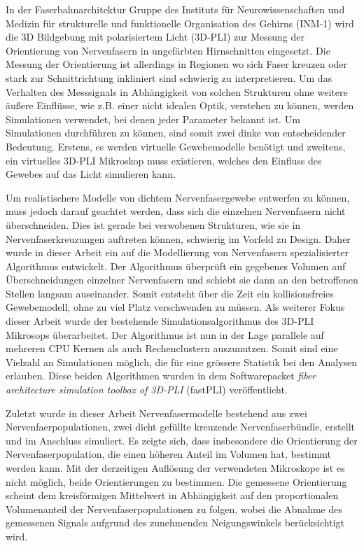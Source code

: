 % 
% 
% 
{
\let\cleardoublepage\clearpage
{}
}
% 
In der Faserbahnarchitektur Gruppe des Instituts für Neurowissenschaften und Medizin für strukturelle und funktionelle Organisation des Gehirns (INM-1) wird die 3D Bildgebung mit polarisiertem Licht (3D-PLI) zur Messung der Orientierung von Nervenfasern in ungefärbten Hirnschnitten eingesetzt.
Die Messung der Orientierung ist allerdings in Regionen wo sich Faser kreuzen oder stark zur Schnittrichtung inkliniert sind schwierig zu interpretieren.
Um das Verhalten des Messsignals in Abhängigkeit von solchen Strukturen ohne weitere äußere Einflüsse, wie z.B. einer nicht idealen Optik, verstehen zu können, werden Simulationen verwendet, bei denen jeder Parameter bekannt ist.
Um Simulationen durchführen zu können, sind somit zwei dinke von entscheidender Bedeutung.
Erstens, es werden virtuelle Gewebemodelle benötigt und zweitens, ein virtuelles 3D-PLI Mikroskop muss existieren, welches den Einfluss des Gewebes auf das Licht simulieren kann. 

Um realistischere Modelle von dichtem Nervenfasergewebe entwerfen zu können, muss jedoch darauf geachtet werden, dass sich die einzelnen Nervenfasern nicht überschneiden.
Dies ist gerade bei verwobenen Strukturen, wie sie in Nervenfaserkreuzungen auftreten können, schwierig im Vorfeld zu Design.
Daher wurde in dieser Arbeit ein auf die Modellierung von Nervenfasern spezialisierter Algorithmus entwickelt.
Der Algorithmus überprüft ein gegebenes Volumen auf Überschneidungen einzelner Nervenfasern und schiebt sie dann an den betroffenen Stellen langsam auseinander.
Somit entsteht über die Zeit ein kollisionsfreies Gewebemodell, ohne zu viel Platz verschwenden zu müssen.
Als weiterer Fokus dieser Arbeit wurde der bestehende Simulationsalgorithmus des 3D-PLI Mikrosops überarbeitet.
Der Algorithmus ist nun in der Lage parallele auf mehreren CPU Kernen als auch Rechenclustern auszunutzen.
Somit sind eine Vielzahl an Simulationen möglich, die für eine grössere Statistik bei den Analysen erlauben.
Diese beiden Algorithmen wurden in dem Softwarepacket \textit{fiber architecture simulation toolbox of 3D-PLI} (fastPLI) veröffentlicht. 

Zuletzt wurde in dieser Arbeit Nervenfasermodelle bestehend aus zwei Nervenfaerpopulationen, zwei dicht gefüllte kreuzende Nervenfaserbündle, erstellt und im Anschluss simuliert.
Es zeigte sich, dass insbesondere die Orientierung der Nervenfaserpopulation, die einen höheren Anteil im Volumen hat, bestimmt werden kann.
Mit der derzeitigen Auflösung der verwendeten Mikroskope ist es nicht möglich, beide Orientierungen zu bestimmen.
Die gemessene Orientierung scheint dem kreisförmigen Mittelwert in Abhängigkeit auf den proportionalen Volumenanteil der Nervenfaserpopulationen zu folgen, wobei die Abnahme des gemessenen Signals aufgrund des zunehmenden Neigungswinkels berücksichtigt wird.
